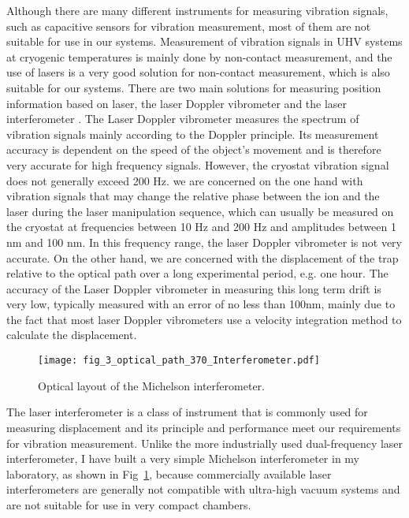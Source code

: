 Although there are many different instruments for measuring vibration signals, such as capacitive sensors for vibration measurement, most of them are not suitable for use in our systems. Measurement of vibration signals in UHV systems at cryogenic temperatures is mainly done by non-contact measurement, and the use of lasers is a very good solution for non-contact measurement, which is also suitable for our systems. There are two main solutions for measuring position information based on laser, the laser Doppler vibrometer and the laser interferometer \cite{RN295}. The Laser Doppler vibrometer measures the spectrum of vibration signals mainly according to the Doppler principle. Its measurement accuracy is dependent on the speed of the object's movement and is therefore very accurate for high frequency signals. However, the cryostat vibration signal does not generally exceed 200 Hz. we are concerned on the one hand with vibration signals that may change the relative phase between the ion and the laser during the laser manipulation sequence, which can usually be measured on the cryostat at frequencies between 10 Hz and 200 Hz and amplitudes between 1 nm and 100 nm. In this frequency range, the laser Doppler vibrometer is not very accurate. On the other hand, we are concerned with the displacement of the trap relative to the optical path over a long experimental period, e.g. one hour. The accuracy of the Laser Doppler vibrometer in measuring this long term drift is very low, typically measured with an error of no less than 100nm, mainly due to the fact that most laser Doppler vibrometers use a velocity integration method to calculate the displacement.

\begin{figure}
    \centering
    \texttt{[image: fig\_3\_optical\_path\_370\_Interferometer.pdf]}
    \caption{Optical layout of the Michelson interferometer.}
    \label{fig:fig_3_optical_path_370_Interferometer}
\end{figure}

The laser interferometer is a class of instrument that is commonly used for measuring displacement and its principle and performance meet our requirements for vibration measurement. Unlike the more industrially used dual-frequency laser interferometer, I have built a very simple Michelson interferometer in my laboratory, as shown in Fig~\ref{fig:fig_3_optical_path_370_Interferometer}, because commercially available laser interferometers are generally not compatible with ultra-high vacuum systems and are not suitable for use in very compact chambers.

